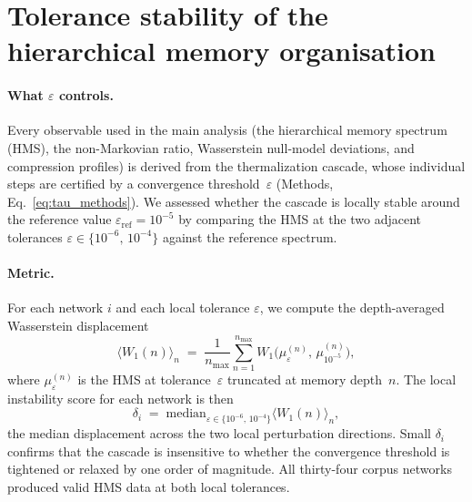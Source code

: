 \documentclass[aps,superscriptaddress,11pt]{revtex4-2}
\theoremstyle{definition}
\theoremstyle{plain}
\begin{document}
\section{Tolerance stability of the hierarchical memory organisation}
\label{sec:eps_stability}

\paragraph{What $\varepsilon$ controls.}
Every observable used in the main analysis (the hierarchical memory
spectrum (HMS), the non-Markovian ratio, Wasserstein null-model deviations,
and compression profiles) is derived from the thermalization cascade,
whose individual steps are certified by a convergence threshold~$\varepsilon$
(Methods, Eq.~\eqref{eq:tau_methods}).  We assessed whether the cascade is
locally stable around the reference value $\varepsilon_{\mathrm{ref}} =
10^{-5}$ by comparing the HMS at the two adjacent tolerances $\varepsilon
\in \{10^{-6},\,10^{-4}\}$ against the reference spectrum.

\paragraph{Metric.}
For each network $i$ and each local tolerance $\varepsilon$, we compute
the depth-averaged Wasserstein displacement
\[
\langle W_1(n)\rangle_n
\;=\;
\frac{1}{n_{\max}}\sum_{n=1}^{n_{\max}}
W_1\!\bigl(\mu_{\varepsilon}^{(n)},\,\mu_{10^{-5}}^{(n)}\bigr),
\]
where $\mu_\varepsilon^{(n)}$ is the HMS at tolerance~$\varepsilon$ truncated
at memory depth~$n$.  The local instability score for each network is then
\[
\delta_i
\;=\;
\mathrm{median}_{\varepsilon\in\{10^{-6},\,10^{-4}\}}
\langle W_1(n)\rangle_n,
\]
the median displacement across the two local perturbation directions.
Small $\delta_i$ confirms that the cascade is insensitive to whether the
convergence threshold is tightened or relaxed by one order of magnitude.
All thirty-four corpus networks produced valid HMS data at both local
tolerances.
\end{document}
